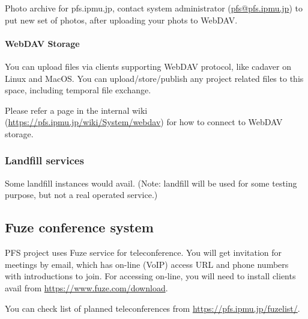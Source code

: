 \documentclass[a4paper,notitlepage]{article}
\begin{document}
Photo archive for pfs.ipmu.jp, 
contact system administrator (\url{pfs@pfs.ipmu.jp}) to put new 
set of photos, after uploading your phots to WebDAV. 


\paragraph{WebDAV Storage}
\label{sec:pfs-webdav}

You can upload files via clients supporting WebDAV protocol, like cadaver on 
Linux and MacOS. 
You can upload/store/publish any project related files to this space, 
including temporal file exchange. 

Please refer a page in the internal wiki (\url{https://pfs.ipmu.jp/wiki/System/webdav}) 
for how to connect to WebDAV storage.

\subsubsection{Landfill services}

Some landfill instances would avail. 
(Note: landfill will be used for some testing purpose, but not a real 
operated service.) 


\subsection{Fuze conference system}
\label{sec:pfs-fuze}

PFS project uses Fuze service for teleconference. 
You will get invitation for meetings by email, which has on-line (VoIP) 
access URL and phone numbers with introductions to join. 
For accessing on-line, you will need to install clients avail from 
\url{https://www.fuze.com/download}. 

You can check list of planned teleconferences from 
\url{https://pfs.ipmu.jp/fuzelist/}. 
\end{document}
